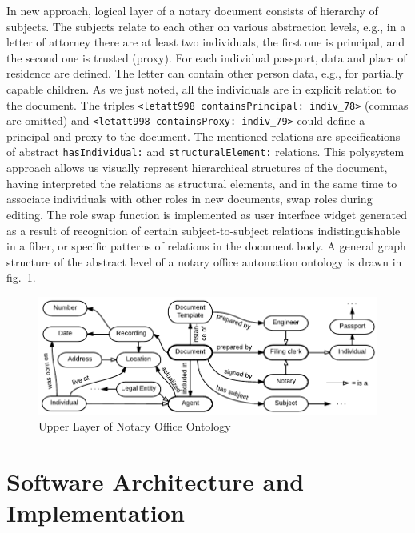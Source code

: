 \documentclass[conference]{IEEEtran}
\begin{document}
In new approach, logical layer of a notary document consists of
hierarchy of subjects.  The subjects relate to each other on various
abstraction levels, e.g., in a letter of attorney there are at least
two individuals, the first one is principal, and the second one is
trusted (proxy).  For each individual passport, data and place of
residence are defined.  The letter can contain other person data,
e.g., for partially capable children.  As we just noted, all the
individuals are in explicit relation to the document.  The triples
\texttt{<letatt998 containsPrincipal: indiv\_78>} (commas are omitted)
and \texttt{<letatt998 containsProxy: indiv\_79>} could define a
principal and proxy to the document.  The mentioned relations are
specifications of abstract \texttt{hasIndividual:} and
\texttt{structuralElement:} relations.  This polysystem approach
allows us visually represent hierarchical structures of the document,
having interpreted the relations as structural elements, and in the
same time to associate individuals with other roles in new documents,
swap roles during editing.  The role swap function is implemented as
user interface widget generated as a result of recognition of certain
subject-to-subject relations indistinguishable in a fiber, or specific
patterns of relations in the document body.  A general graph structure
of the abstract level of a notary office automation ontology is drawn
in fig.~\ref{notaryontology}.

\begin{figure}[!t]
\centering
\includegraphics[width=\linewidth]{DocumentOntology-en.pdf}
\caption{Upper Layer of Notary Office Ontology}
\label{notaryontology}
\end{figure}

\section{Software Architecture and Implementation}
\label{sec:arch}
\end{document}
